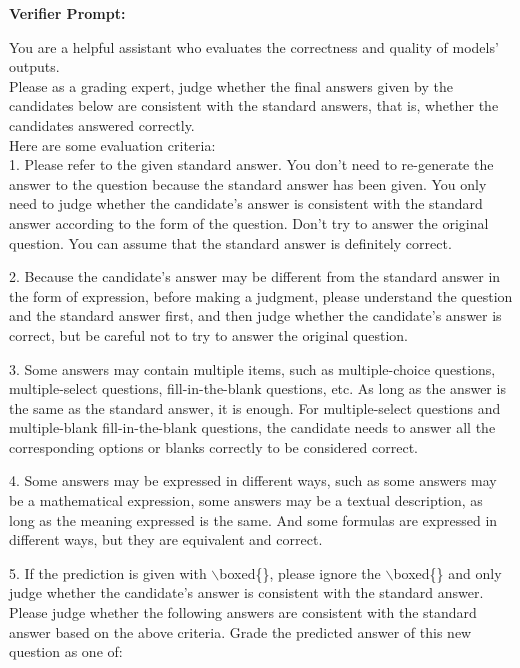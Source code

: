 \begin{figure*}[h] 
\begin{AIbox}{}
{\bf Verifier Prompt:} \\
{
You are a helpful assistant who evaluates the correctness and quality of models' outputs.
\\

Please as a grading expert, judge whether the final answers given by the candidates below are consistent with the standard answers, that is, whether the candidates answered correctly. 
\\
    
Here are some evaluation criteria:
\\

1. Please refer to the given standard answer. You don't need to re-generate the answer to the question because the standard answer has been given. You only need to judge whether the candidate's answer is consistent with the standard answer according to the form of the question. Don't try to answer the original question. You can assume that the standard answer is definitely correct.

2. Because the candidate's answer may be different from the standard answer in the form of expression, before making a judgment, please understand the question and the standard answer first, and then judge whether the candidate's answer is correct, but be careful not to try to answer the original question.

3. Some answers may contain multiple items, such as multiple-choice questions, multiple-select questions, fill-in-the-blank questions, etc. As long as the answer is the same as the standard answer, it is enough. For multiple-select questions and multiple-blank fill-in-the-blank questions, the candidate needs to answer all the corresponding options or blanks correctly to be considered correct.

4. Some answers may be expressed in different ways, such as some answers may be a mathematical expression, some answers may be a textual description, as long as the meaning expressed is the same. And some formulas are expressed in different ways, but they are equivalent and correct.

5. If the prediction is given with $\backslash$boxed\{\}, please ignore the $\backslash$boxed\{\} and only judge whether the candidate's answer is consistent with the standard answer.
\\

Please judge whether the following answers are consistent with the standard answer based on the above criteria. Grade the predicted answer of this new question as one of:

}
\end{AIbox}
\end{figure*}
